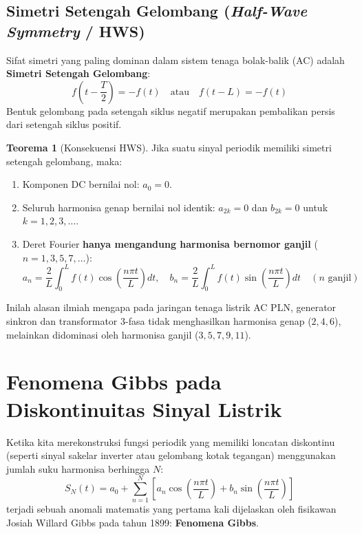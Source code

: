 \documentclass[11pt,a4paper]{article}
\theoremstyle{definition}
\newtheorem{theorem}{Teorema}[section]
\begin{document}
\subsection{Simetri Setengah Gelombang (\textit{Half-Wave Symmetry} / HWS)}
Sifat simetri yang paling dominan dalam sistem tenaga bolak-balik (AC) adalah \textbf{Simetri Setengah Gelombang}:
\begin{equation}
    f\left(t - \frac{T}{2}\right) = -f(t) \quad \text{atau} \quad f(t - L) = -f(t)
    \label{eq:hws_def}
\end{equation}
Bentuk gelombang pada setengah siklus negatif merupakan pembalikan persis dari setengah siklus positif.
\begin{theorem}[Konsekuensi HWS]
Jika suatu sinyal periodik memiliki simetri setengah gelombang, maka:
\begin{enumerate}[leftmargin=*]
    \item Komponen DC bernilai nol: $a_0 = 0$.
    \item Seluruh harmonisa genap bernilai nol identik: $a_{2k} = 0$ dan $b_{2k} = 0$ untuk $k = 1, 2, 3, \dots$.
    \item Deret Fourier \textbf{hanya mengandung harmonisa bernomor ganjil} ($n = 1, 3, 5, 7, \dots$):
    \begin{equation}
        a_n = \frac{2}{L} \int_{0}^{L} f(t) \cos\left(\frac{n\pi t}{L}\right) dt, \quad b_n = \frac{2}{L} \int_{0}^{L} f(t) \sin\left(\frac{n\pi t}{L}\right) dt \quad (n \text{ ganjil})
    \end{equation}
\end{enumerate}
\end{theorem}
Inilah alasan ilmiah mengapa pada jaringan tenaga listrik AC PLN, generator sinkron dan transformator 3-fasa tidak menghasilkan harmonisa genap ($2, 4, 6$), melainkan didominasi oleh harmonisa ganjil ($3, 5, 7, 9, 11$).

\section{Fenomena Gibbs pada Diskontinuitas Sinyal Listrik}

Ketika kita merekonstruksi fungsi periodik yang memiliki loncatan diskontinu (seperti sinyal sakelar inverter atau gelombang kotak tegangan) menggunakan jumlah suku harmonisa berhingga $N$:
\begin{equation}
    S_N(t) = a_0 + \sum_{n=1}^{N} \left[ a_n \cos\left(\frac{n\pi t}{L}\right) + b_n \sin\left(\frac{n\pi t}{L}\right) \right]
\end{equation}
terjadi sebuah anomali matematis yang pertama kali dijelaskan oleh fisikawan Josiah Willard Gibbs pada tahun 1899: \textbf{Fenomena Gibbs}.
\end{document}
